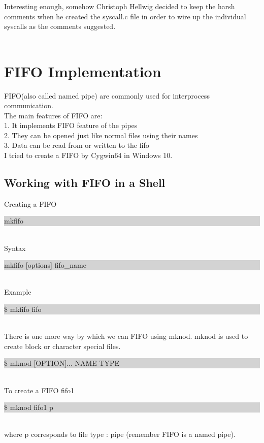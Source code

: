 \documentclass[10pt,preprint]{sigplanconf}
\begin{document}
Interesting enough, somehow Christoph Hellwig decided to keep the harsh comments when he created the syscall.c file in order to wire up the individual syscalls as the comments suggested. \\\\

\section{FIFO Implementation}

FIFO(also called named pipe) are commonly used for interprocess communication. \\
The main features of FIFO are:\\
1. It implements FIFO feature of the pipes\\
2. They can be opened just like normal files using their names\\
3. Data can be read from or written to the fifo\\
I tried to create a FIFO by Cygwin64 in Windows 10.\\
\subsection{Working with FIFO in a Shell}
Creating a FIFO\\
\colorbox{lightgray}{\begin{minipage}{8cm}
mkfifo
\end{minipage}}\\
Syntax\\
\colorbox{lightgray}{\begin{minipage}{8cm}
mkfifo [options] fifo\_name
\end{minipage}}\\
Example\\
\colorbox{lightgray}{\begin{minipage}{8cm}
\$ mkfifo fifo
\end{minipage}}\\
There is one more way by which we can FIFO using mknod. mknod is used to create block or character special files.\\
\colorbox{lightgray}{\begin{minipage}{8cm}
\$ mknod [OPTION]... NAME TYPE
\end{minipage}}\\
To create a FIFO fifo1\\
\colorbox{lightgray}{\begin{minipage}{8cm}
\$ mknod fifo1 p
\end{minipage}}\\
where p corresponds to file type : pipe (remember FIFO is a named pipe).\\
\end{document}
